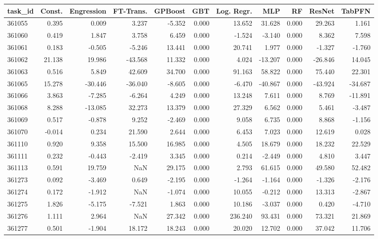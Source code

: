 \begin{tabular}{lrrrrrrrrrr}
\toprule
task\_id & Const. & Engression & FT-Trans. & GPBoost & GBT & Log. Regr. & MLP & RF & ResNet & TabPFN \\
\midrule
361055 & 0.395 & 0.009 & 3.237 & -5.352 & 0.000 & 13.652 & 31.628 & 0.000 & 29.263 & 1.161 \\
361060 & 0.419 & 1.847 & 3.758 & 6.459 & 0.000 & -1.524 & -3.140 & 0.000 & 8.362 & 7.598 \\
361061 & 0.183 & -0.505 & -5.246 & 13.441 & 0.000 & 20.741 & 1.977 & 0.000 & -1.327 & -1.760 \\
361062 & 21.138 & 19.986 & -43.568 & 11.332 & 0.000 & 4.024 & -13.207 & 0.000 & -26.846 & 14.045 \\
361063 & 0.516 & 5.849 & 42.609 & 34.700 & 0.000 & 91.163 & 58.822 & 0.000 & 75.440 & 22.301 \\
361065 & 15.278 & -30.446 & -36.040 & -8.605 & 0.000 & -6.470 & -40.867 & 0.000 & -43.924 & -34.687 \\
361066 & 3.863 & -7.285 & -6.264 & 4.249 & 0.000 & 13.248 & 7.611 & 0.000 & 8.769 & -11.891 \\
361068 & 8.288 & -13.085 & 32.273 & 13.379 & 0.000 & 27.329 & 6.562 & 0.000 & 5.461 & -3.487 \\
361069 & 0.517 & -0.878 & 9.252 & -2.469 & 0.000 & 9.058 & 6.735 & 0.000 & 8.868 & -1.156 \\
361070 & -0.014 & 0.234 & 21.590 & 2.644 & 0.000 & 6.453 & 7.023 & 0.000 & 12.619 & 0.028 \\
361110 & 0.920 & 9.358 & 15.500 & 16.985 & 0.000 & 4.505 & 18.679 & 0.000 & 18.232 & 22.529 \\
361111 & 0.232 & -0.443 & -2.419 & 3.345 & 0.000 & 0.214 & -2.449 & 0.000 & 4.810 & 3.447 \\
361113 & 0.591 & 19.759 & NaN & 29.175 & 0.000 & 2.793 & 61.615 & 0.000 & 49.580 & 52.482 \\
361273 & 0.092 & -3.469 & 0.649 & -2.195 & 0.000 & -1.264 & -1.164 & 0.000 & -1.326 & -2.176 \\
361274 & 0.172 & -1.912 & NaN & -1.074 & 0.000 & 10.055 & -0.212 & 0.000 & 13.313 & -2.867 \\
361275 & 1.826 & -5.175 & -7.521 & 1.863 & 0.000 & 10.186 & -3.037 & 0.000 & 0.420 & -4.710 \\
361276 & 1.111 & 2.964 & NaN & 27.342 & 0.000 & 236.240 & 93.431 & 0.000 & 73.321 & 21.869 \\
361277 & 0.501 & -1.904 & 18.172 & 18.243 & 0.000 & 20.020 & 12.702 & 0.000 & 37.042 & 11.706 \\

\end{tabular}

